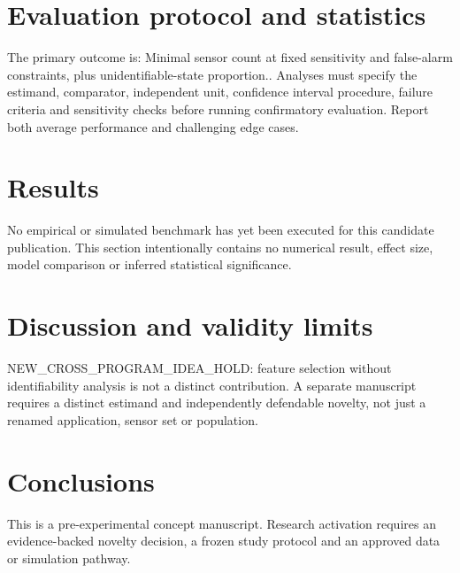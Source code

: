 \documentclass[11pt,a4paper]{article}
\begin{document}
\section{Evaluation protocol and statistics}
The primary outcome is: Minimal sensor count at fixed sensitivity and false-alarm constraints, plus unidentifiable-state proportion.. Analyses must specify the estimand, comparator, independent unit, confidence interval procedure, failure criteria and sensitivity checks before running confirmatory evaluation. Report both average performance and challenging edge cases.
\section{Results}
No empirical or simulated benchmark has yet been executed for this candidate publication. This section intentionally contains no numerical result, effect size, model comparison or inferred statistical significance.
\section{Discussion and validity limits}
NEW\_CROSS\_PROGRAM\_IDEA\_HOLD: feature selection without identifiability analysis is not a distinct contribution. A separate manuscript requires a distinct estimand and independently defendable novelty, not just a renamed application, sensor set or population.
\section{Conclusions}
This is a pre-experimental concept manuscript. Research activation requires an evidence-backed novelty decision, a frozen study protocol and an approved data or simulation pathway.
\end{document}
